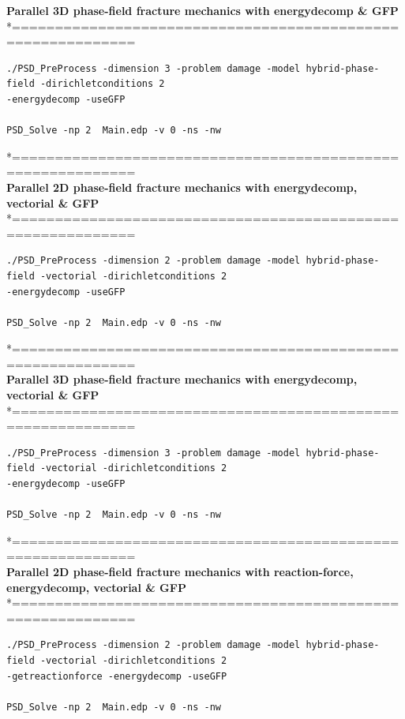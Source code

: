 \documentclass{report}
\begin{document}
\textbf{ Parallel 3D phase-field fracture mechanics with energydecomp \& GFP} \\
*============================================================\\
\begin{lstlisting}[style=Linux]
./PSD_PreProcess -dimension 3 -problem damage -model hybrid-phase-field -dirichletconditions 2
-energydecomp -useGFP   

PSD_Solve -np 2  Main.edp -v 0 -ns -nw   	
\end{lstlisting}
*============================================================\\
 \textbf{Parallel 2D phase-field fracture mechanics with energydecomp, vectorial \& GFP} \\
*============================================================\\
\begin{lstlisting}[style=Linux]
./PSD_PreProcess -dimension 2 -problem damage -model hybrid-phase-field -vectorial -dirichletconditions 2 
-energydecomp -useGFP  

PSD_Solve -np 2  Main.edp -v 0 -ns -nw   
\end{lstlisting}
*============================================================\\
\textbf{ Parallel 3D phase-field fracture mechanics with energydecomp, vectorial \& GFP} \\
*============================================================\\
\begin{lstlisting}[style=Linux]
./PSD_PreProcess -dimension 3 -problem damage -model hybrid-phase-field -vectorial -dirichletconditions 2
-energydecomp -useGFP   

PSD_Solve -np 2  Main.edp -v 0 -ns -nw   	
\end{lstlisting}
*============================================================\\
 \textbf{Parallel 2D phase-field fracture mechanics with reaction-force, energydecomp, vectorial \& GFP} \\
*============================================================\\
\begin{lstlisting}[style=Linux]
./PSD_PreProcess -dimension 2 -problem damage -model hybrid-phase-field -vectorial -dirichletconditions 2 
-getreactionforce -energydecomp -useGFP  

PSD_Solve -np 2  Main.edp -v 0 -ns -nw   
\end{lstlisting}
\end{document}
